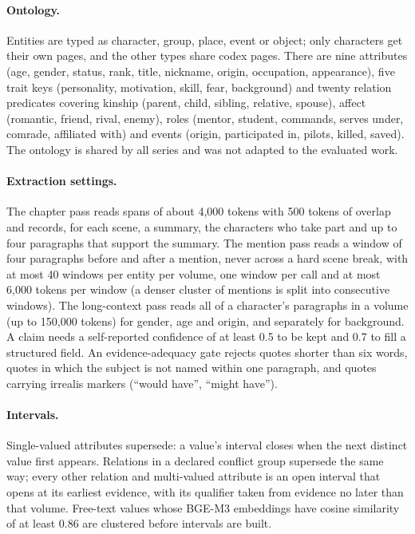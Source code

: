 \paragraph{Ontology.} Entities are typed as character, group, place, event or object; only
characters get their own pages, and the other types share codex pages. There are nine
attributes (age, gender, status, rank, title, nickname, origin, occupation, appearance), five
trait keys (personality, motivation, skill, fear, background) and twenty relation predicates
covering kinship (parent, child, sibling, relative, spouse), affect (romantic, friend, rival,
enemy), roles (mentor, student, commands, serves under, comrade, affiliated with) and events
(origin, participated in, pilots, killed, saved). The ontology is shared by all series and was
not adapted to the evaluated work.

\paragraph{Extraction settings.} The chapter pass reads spans of about 4{,}000 tokens with 500
tokens of overlap and records, for each scene, a summary, the characters who take part and up
to four paragraphs that support the summary. The mention pass reads a window of four
paragraphs before and after a mention, never across a hard scene break, with at most 40
windows per entity per volume, one window per call and at most 6{,}000 tokens per window (a
denser cluster of mentions is split into consecutive windows). The long-context pass reads all of a character's paragraphs in a volume
(up to 150{,}000 tokens) for gender, age and origin, and separately for background. A claim
needs a self-reported confidence of at least 0.5 to be kept and 0.7 to fill a structured
field. An evidence-adequacy gate rejects quotes shorter than six words, quotes in which the
subject is not named within one paragraph, and quotes carrying irrealis markers (``would
have'', ``might have'').

\paragraph{Intervals.} Single-valued attributes supersede: a value's interval closes when the
next distinct value first appears. Relations in a declared conflict group supersede the same
way; every other relation and multi-valued attribute is an open interval that opens at its
earliest evidence, with its qualifier taken from evidence no later than that volume. Free-text
values whose BGE-M3 embeddings have cosine similarity of at least 0.86 are clustered before
intervals are built.

